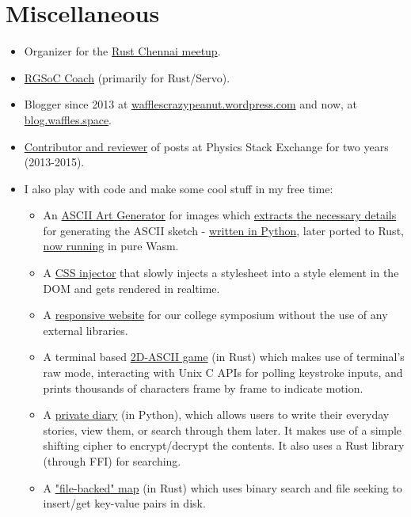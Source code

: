 \documentclass[11pt,a4paper,sans]{moderncv}        %
\newcommand\chref[3][linky]{\href{#2}{\color{#1}#3}}
\begin{document}
\section{Miscellaneous}
\begin{itemize}
	\item Organizer for the \chref{https://www.meetup.com/mad-rs/}{Rust Chennai meetup}.
	\item \chref{https://teams.railsgirlssummerofcode.org/users/2358}{RGSoC Coach} (primarily for Rust/Servo).
	\item Blogger since 2013 at \chref{https://wafflescrazypeanut.wordpress.com/}{wafflescrazypeanut.wordpress.com} and now, at \chref{https://blog.waffles.space/}{blog.waffles.space}.
	\item \chref{https://physics.stackexchange.com/users/11062}{Contributor and reviewer} of posts at Physics Stack Exchange for two years (2013-2015).
	\item I also play with code and make some cool stuff in my free time:
	\begin{itemize}
		\item An \chref{https://github.com/wafflespeanut/ascii-art-generator}{ASCII Art Generator} for images which \chref{https://blog.waffles.space/2017/03/01/ascii-sketch/}{extracts the necessary details} for generating the ASCII sketch - \chref{https://github.com/wafflespeanut/ascii-art-generator/tree/0b519b00b43eadb8500db30c304b2b87ad7eb159}{written in Python}, later ported to Rust, \chref{https://waffles.space/ascii-gen/}{now running} in pure Wasm.
		\item A \chref{https://github.com/wafflespeanut/AISH}{CSS injector} that slowly injects a stylesheet into a style element in the DOM and gets rendered in realtime.
		\item A \chref{https://github.com/wafflespeanut/flight-2016}{responsive website} for our college symposium without the use of any external libraries.
		\item A terminal based \chref{https://github.com/wafflespeanut/free-fall}{2D-ASCII game} (in Rust) which makes use of terminal's raw mode, interacting with Unix C APIs for polling keystroke inputs, and prints thousands of characters frame by frame to indicate motion.
		\item A \chref{https://github.com/wafflespeanut/biographer}{private diary} (in Python), which allows users to write their everyday stories, view them, or search through them later. It makes use of a simple shifting cipher to encrypt/decrypt the contents. It also uses a Rust library (through FFI) for searching.
		\item A \chref{https://github.com/wafflespeanut/rust-catalog}{"file-backed" map} (in Rust) which uses binary search and file seeking to insert/get key-value pairs in disk.
	\end{itemize}
\end{itemize}
\end{document}
